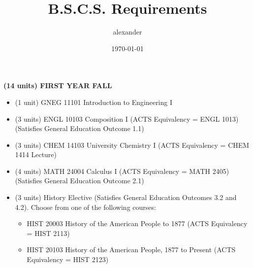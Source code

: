 \documentclass{article}
\title{B.S.C.S. Requirements}
\date{\today}
\author{alexander}
\begin{document}
\maketitle

\textbf{(14 units) FIRST YEAR FALL}
	\begin{itemize}
		\item (1 unit) GNEG 11101 Introduction to Engineering I
		\item (3 units) ENGL 10103 Composition I (ACTS Equivalency = ENGL 1013) (Satisfies General Education Outcome 1.1)
		\item (3 units) CHEM 14103 University Chemistry I (ACTS Equivalency = CHEM 1414 Lecture)
		\item (4 units) MATH 24004 Calculus I (ACTS Equivalency = MATH 2405) (Satisfies General Education Outcome 2.1)
		\item (3 units) History Elective (Satisfies General Education Outcomes 3.2 and 4.2). Choose from one of the following courses:
			\begin{itemize}
				\item HIST 20003 History of the American People to 1877 (ACTS Equivalency = HIST 2113)
				\item HIST 20103 History of the American People, 1877 to Present (ACTS Equivalency = HIST 2123)
			\end{itemize}
	\end{itemize}
\end{document}
